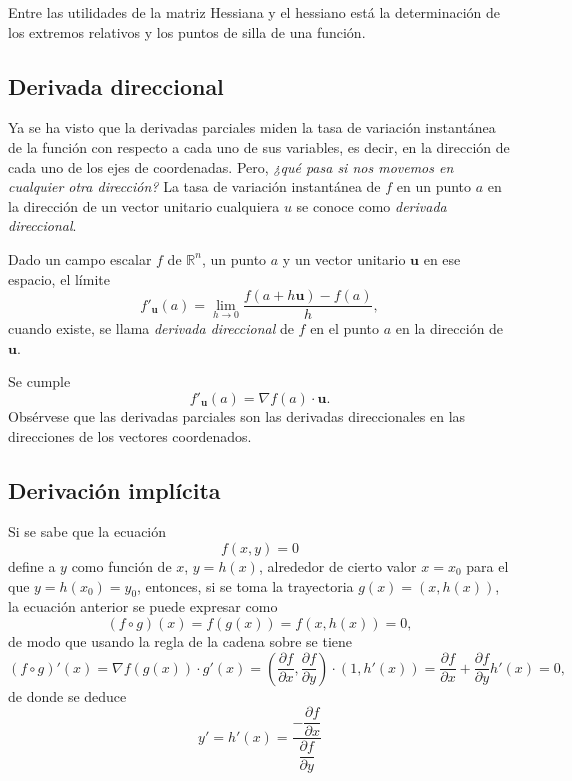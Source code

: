 Entre las utilidades de la matriz Hessiana y el hessiano está la determinación de los extremos relativos y los puntos de
silla de una función. 

\subsection{Derivada direccional}
Ya se ha visto que la derivadas parciales miden la tasa de variación instantánea de la función con respecto a cada uno
de sus variables, es decir, en la dirección de cada uno de los ejes de coordenadas. 
Pero, \emph {¿qué pasa si nos movemos en cualquier otra dirección?}
La tasa de variación instantánea de $f$ en un punto $a$ en la dirección de un vector unitario cualquiera $u$ se conoce
como \emph{derivada direccional}.

\begin{definicion}
Dado un campo escalar $f$ de $\mathbb{R}^n$, un punto $a$ y un vector unitario $\mathbf{u}$ en ese espacio, el límite
\[
f'_{\mathbf{u}}(a) = \lim_{h\rightarrow 0}\frac{f(a+h\mathbf{u})-f(a)}{h},
\] 
cuando existe, se llama \emph{derivada direccional} de $f$ en el punto $a$ en la dirección de $\mathbf{u}$.
\end{definicion}
Se cumple 
\[
f'_{\mathbf{u}}(a) =\nabla f(a)\cdot \mathbf{u}.
\]
Obsérvese que las derivadas parciales son las derivadas direccionales en las direcciones de los vectores coordenados.

\subsection{Derivación implícita}
Si se sabe que la ecuación 
\[
f(x,y)=0
\]
define a $y$ como función de $x$, $y=h(x)$, alrededor de cierto valor $x=x_0$ para el que $y=h(x_0)=y_0$, entonces, si se toma la trayectoria $g(x)=(x,h(x))$, la ecuación anterior se puede expresar como
\[
(f\circ g)(x) = f(g(x)) = f(x,h(x))=0,
\]
de modo que usando la regla de la cadena sobre se tiene
\[
(f\circ g)'(x) = \nabla f(g(x))\cdot g'(x) = \left(\frac{\partial f}{\partial x}, \frac{\partial f}{\partial y}\right)\cdot (1,h'(x)) = 
\frac{\partial f}{\partial x}+\frac{\partial f}{\partial y}h'(x) = 0,
\] 
de donde se deduce
\[
y'=h'(x)=\frac{-\dfrac{\partial f}{\partial x}}{\dfrac{\partial f}{\partial y}}
\]

